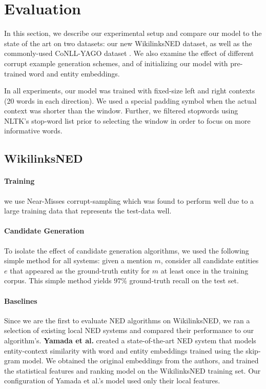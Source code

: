 \documentclass[11pt]{article}
\begin{document}
	\section{Evaluation}
	\label{experiments}
	
	In this section, we describe our experimental setup and compare our model to the state of the art on two datasets: our new WikilinksNED dataset, as well as the commonly-used CoNLL-YAGO dataset \cite{hoffart2011robust}. We also examine the effect of different corrupt example generation schemes, and of initializing our model with pre-trained word and entity embeddings.
	
	In all experiments, our model was trained with fixed-size left and right contexts (20 words in each direction). We used a special padding symbol when the actual context was shorter than the window. Further, we filtered stopwords using NLTK's stop-word list prior to selecting the window in order to focus on more informative words.
	
	\subsection{WikilinksNED}
	
	\paragraph{Training} we use Near-Misses corrupt-sampling which was found to perform well due to a large training data that represents the test-data well.
	
	\paragraph{Candidate Generation}
	To isolate the effect of candidate generation algorithms, we used the following simple method for all systems: given a mention $m$, consider all candidate entities $e$ that appeared as the ground-truth entity for $m$ at least once in the training corpus. This simple method yields $97\%$ ground-truth recall on the test set.
	
	\paragraph{Baselines}
	Since we are the first to evaluate NED algorithms on WikilinksNED, we ran a selection of existing local NED systems and compared their performance to our algorithm's. \textbf{Yamada et al.}  created a state-of-the-art NED system that models entity-context similarity with word and entity embeddings trained using the skip-gram model. We obtained the original embeddings from the authors, and trained the statistical features and ranking model on the WikilinksNED training set. Our configuration of Yamada et al.'s model used only their local features.
	
\end{document}
